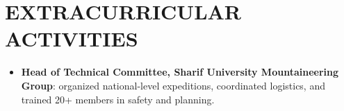 \documentclass[10pt, letterpaper]{article}
\begin{document}
\section{EXTRACURRICULAR ACTIVITIES}

\begin{itemize}
    \item \textbf{Head of Technical Committee, Sharif University Mountaineering Group}: organized national-level expeditions, coordinated logistics, and trained 20+ members in safety and planning.
\end{itemize}

\end{document}
